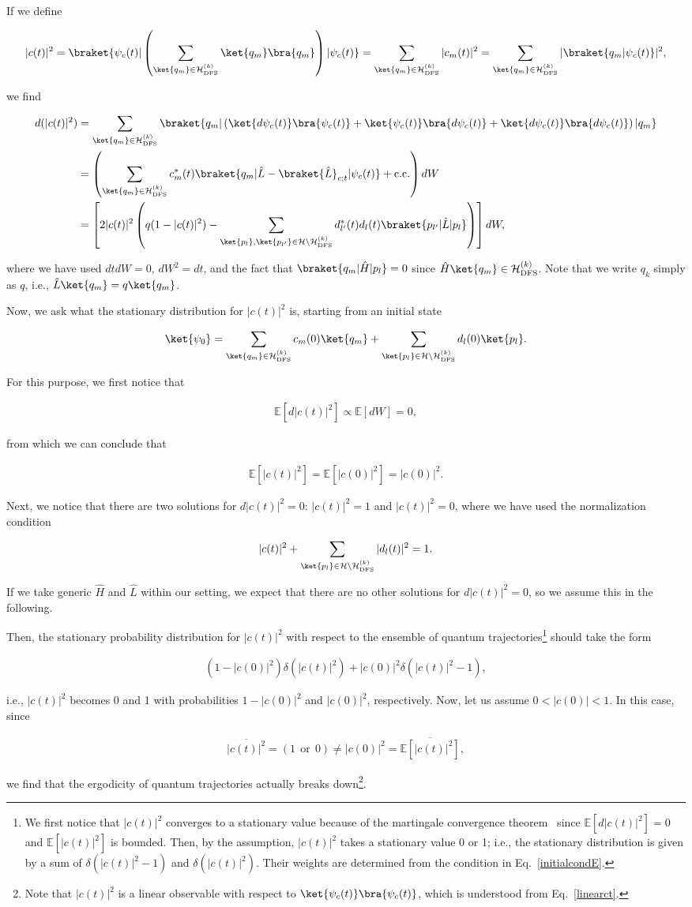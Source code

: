 \documentclass[preprint,pteplogo]{ptephy_v2}%
\numberwithin{equation}{section}
\theoremstyle{definition}
\newcommand{\av}[1]{\overline{#1}}
\newcommand{\ml}[1]{\mathcal{#1}}
\newcommand{\mr}[1]{\mathrm{#1}}
\newcommand{\mbb}[1]{\mathbb{#1}}
\newcommand{\lrs}[1]{\left( #1 \right)}
\newcommand{\lrl}[1]{\left[ #1 \right]}
\newcommand{\aln}[1]{
\begin{align}
#1
\end{align}
}
\begin{document}
If we define 
\aln{\label{linearct}
|c(t)|^2=\braket{\psi_c(t)|\lrs{\sum_{\ket{q_m}\in\ml{H}_\mr{DFS}^{(k)}}\ket{q_m}\bra{q_m}}|\psi_c(t)}=\sum_{\ket{q_m}\in\ml{H}_\mr{DFS}^{(k)}}|c_m(t)|^2=\sum_{\ket{q_m}\in\ml{H}_\mr{DFS}^{(k)}}|\braket{q_m|\psi_c(t)}|^2,
}
we find
\aln{
d(|c(t)|^2)&=\sum_{\ket{q_m}\in\ml{H}_\mr{DFS}^{(k)}}\braket{q_m|\lrs{\ket{d\psi_c(t)}\bra{\psi_c(t)}+\ket{\psi_c(t)}\bra{d\psi_c(t)}+\ket{d\psi_c(t)}\bra{d\psi_c(t)}}|q_m}\nonumber\\
&=\lrs{\sum_{\ket{q_m}\in\ml{H}_\mr{DFS}^{(k)}} c_m^*(t)\braket{q_m|\hat{L}-\braket{\hat{L}}_{c;t}|\psi_c(t)}+\mr{c.c.}}dW\nonumber\\
&=\lrl{2|c(t)|^2\lrs{q(1-|c(t)|^2)-\sum_{\ket{p_l},\ket{p_{l'}}\in\ml{H}\backslash\ml{H}_\mr{DFS}^{(k)}}d_{l'}^*(t)d_l(t)\braket{p_{l'}|\hat{L}|p_l}}}dW,
}
where we have used $dtdW=0$, $dW^2=dt$, and the fact that $\braket{q_m|\hat{H}|p_l}=0$ since $\hat{H}\ket{q_m}\in\ml{H}_\mr{DFS}^{(k)}$.
Note that we write $q_k$ simply as $q$, i.e., $\hat{L}\ket{q_m}=q\ket{q_m}$.

Now, we ask what the stationary distribution for $|c(t)|^2$ is, starting from an initial state
\aln{
\ket{\psi_0}=\sum_{\ket{q_m}\in\ml{H}_\mr{DFS}^{(k)}}c_m(0)\ket{q_m}+
\sum_{\ket{p_l}\in\ml{H}\backslash\ml{H}_\mr{DFS}^{(k)}}d_l(0)\ket{p_l}.
}
For this purpose, we first notice that
\aln{
\mbb{E}\lrl{d|c(t)|^2}\propto \mbb{E}[dW]=0, 
}
from which we can conclude that
\aln{\label{initialcondE}
\mbb{E}\lrl{|c(t)|^2}=\mbb{E}\lrl{|c(0)|^2}=|c(0)|^2.
}
Next, we notice that there are two solutions for $d|c(t)|^2=0$: $|c(t)|^2=1$ and $|c(t)|^2=0$, where we have used the normalization condition
\aln{
|c(t)|^2+\sum_{\ket{p_l}\in\ml{H}\backslash\ml{H}_\mr{DFS}^{(k)}}|d_l(t)|^2=1.
}
If we take generic $\hat{H}$ and $\hat{L}$ within our setting, we expect that there are no other solutions for $d|c(t)|^2=0$, so we assume this in the following.

Then, the stationary probability distribution for $|c(t)|^2$ with respect to the ensemble of quantum trajectories\footnote{
We first notice that $|c(t)|^2$ converges to a stationary value because of the martingale convergence theorem~\cite{hall2014martingale} since $\mathbb{E}[d|c(t)|^2]=0$ and $\mathbb{E}[|c(t)|^2]$ is bounded. 
Then, by the assumption, $|c(t)|^2$ takes a stationary value 0 or 1; i.e., the stationary distribution is given by a sum of $\delta(|c(t)|^2-1)$ and $\delta(|c(t)|^2)$. 
Their weights are determined from the condition in Eq.~\eqref{initialcondE}.
} should take the form
\aln{
(1-|c(0)|^2)\delta(|c(t)|^2)+ |c(0)|^2\delta(|c(t)|^2-1),
}
i.e., $|c(t)|^2$ becomes 0 and 1 with probabilities $1-|c(0)|^2$ and $|c(0)|^2$, respectively.
Now, let us assume $0<|c(0)|<1$. 
In this case, since
\aln{
\av{|c(t)|^2}=(1 \:\:\text{or}\:\:0)
\neq |c(0)|^2 = \av{\mbb{E}\lrl{|c(t)|^2}},
}
we find that the ergodicity of quantum trajectories actually breaks down\footnote{
Note that $|c(t)|^2$ is a linear observable with respect to $\ket{\psi_c(t)}\bra{\psi_c(t)}$, which is understood from Eq.~\eqref{linearct}.
}.
\end{document}
